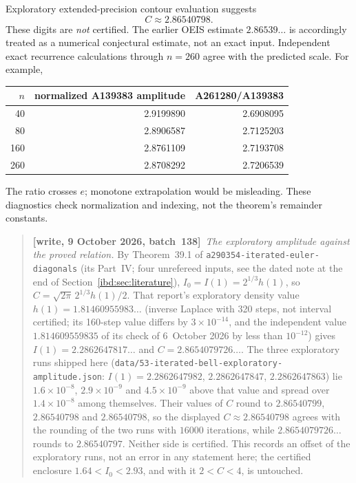 \documentclass[11pt,letterpaper]{article}
\theoremstyle{remark}\newtheorem{remark}[theorem]{Remark}
\newcommand{\repopath}[1]{\nolinkurl{#1}}
\begin{document}
Exploratory extended-precision contour evaluation suggests
\[
 C\approx2.86540798.
\]
These digits are \emph{not} certified. The earlier OEIS estimate $2.86539\ldots$ is accordingly treated as a numerical conjectural estimate, not an exact input. Independent exact recurrence calculations through $n=260$ agree with the predicted scale. For example,
\begin{center}
\begin{tabular}{rrr}\toprule
$n$ & normalized A139383 amplitude & A261280/A139383\\\midrule
40&2.9199890&2.6908095\\
80&2.8906587&2.7125203\\
160&2.8761109&2.7193708\\
260&2.8708292&2.7206539\\\bottomrule
\end{tabular}
\end{center}
The ratio crosses $e$; monotone extrapolation would be misleading. These diagnostics check normalization and indexing, not the theorem's remainder constants.
\par\smallskip\begin{quote}\small\textbf{[write, 9 October 2026, batch~138]}\ \emph{The exploratory amplitude against the proved relation.} By Theorem~39.1 of \repopath{a290354-iterated-euler-diagonals} (its Part~IV; four unrefereed inputs, see the dated note at the end of Section~\ref{ibd:sec:literature}), $I_0=I(1)=2^{1/3}h(1)$, so $C=\sqrt{2\pi}\,2^{1/3}h(1)/2$. That report's exploratory density value $h(1)=1.81460955983\ldots$ (inverse Laplace with 320 steps, not interval certified; its 160-step value differs by $3\times10^{-14}$, and the independent value $1.814609559835$ of its check of 6~October 2026 by less than $10^{-12}$) gives $I(1)=2.2862647817\ldots$ and $C=2.8654079726\ldots$. The three exploratory runs shipped here (\texttt{data/53-iterated-bell-exploratory-amplitude.json}: $I(1)=2.2862647982$, $2.2862647847$, $2.2862647863$) lie $1.6\times10^{-8}$, $2.9\times10^{-9}$ and $4.5\times10^{-9}$ above that value and spread over $1.4\times10^{-8}$ among themselves. Their values of $C$ round to $2.86540799$, $2.86540798$ and $2.86540798$, so the displayed $C\approx2.86540798$ agrees with the rounding of the two runs with $16000$ iterations, while $2.8654079726\ldots$ rounds to $2.86540797$. Neither side is certified. This records an offset of the exploratory runs, not an error in any statement here; the certified enclosure $1.64<I_0<2.93$, and with it $2<C<4$, is untouched.\end{quote}\smallskip
\end{document}
